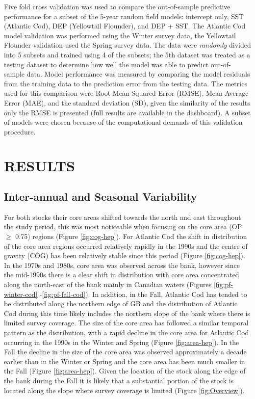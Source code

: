 \documentclass[
]{article}
\begin{document}
Five fold cross validation was used to compare the out-of-sample predictive performance for a subset of the 5-year random field models: intercept only, SST (Atlantic Cod), DEP (Yellowtail Flounder), and DEP + SST. The Atlantic Cod model validation was performed using the Winter survey data, the Yellowtail Flounder validation used the Spring survey data. The data were \emph{randomly} divided into 5 subsets and trained using 4 of the subsets; the 5th dataset was treated as a testing dataset to determine how well the model was able to predict out-of-sample data. Model performance was measured by comparing the model residuals from the training data to the prediction error from the testing data. The metrics used for this comparison were Root Mean Squared Error (RMSE), Mean Average Error (MAE), and the standard deviation (SD), given the similarity of the results only the RMSE is presented (full results are available in the dashboard). A subset of models were chosen because of the computational demands of this validation procedure.

\hypertarget{ref-results}{%
\section{RESULTS}\label{ref-results}}

\hypertarget{inter-annual-and-seasonal-variability}{%
\subsection{Inter-annual and Seasonal Variability}\label{inter-annual-and-seasonal-variability}}

For both stocks their core areas shifted towards the north and east throughout the study period, this was most noticeable when focusing on the core area (OP \(\geq\) 0.75) regions (Figure \ref{fig:cog-hep}). For Atlantic Cod the shift in distribution of the core area regions occurred relatively rapidly in the 1990s and the centre of gravity (COG) has been relatively stable since this period (Figure \ref{fig:cog-hep}). In the 1970s and 1980s, core area was observed across the bank, however since the mid-1990s there is a clear shift in distribution with core area concentrated along the north-east of the bank mainly in Canadian waters (Figures \ref{fig:pf-winter-cod} -\ref{fig:pf-fall-cod}). In addition, in the Fall, Atlantic Cod has tended to be distributed along the northern edge of GB and the distribution of Atlantic Cod during this time likely includes the northern slope of the bank where there is limited survey coverage. The size of the core area has followed a similar temporal pattern as the distribution, with a rapid decline in the core area for Atlantic Cod occurring in the 1990s in the Winter and Spring (Figure \ref{fig:area-hep}). In the Fall the decline in the size of the core area was observed approximately a decade earlier than in the Winter or Spring and the core area has been much smaller in the Fall (Figure \ref{fig:area-hep}). Given the location of the stock along the edge of the bank during the Fall it is likely that a substantial portion of the stock is located along the slope where survey coverage is limited (Figure \ref{fig:Overview}).
\end{document}
